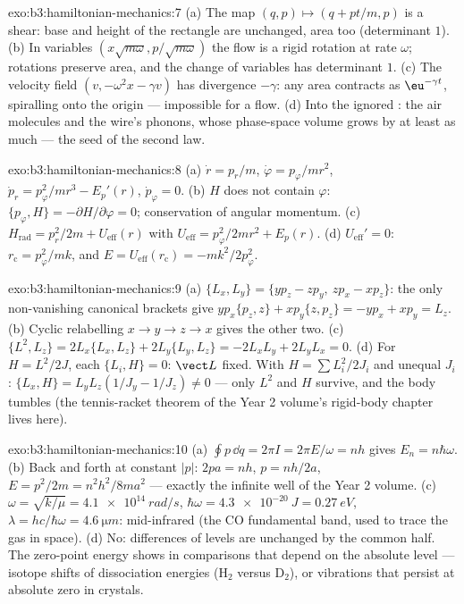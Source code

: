 \begin{solution}{exo:b3:hamiltonian-mechanics:7}
(a) The map $(q, p) \mapsto (q + pt/m, p)$ is a shear: base and
height of the rectangle are unchanged, area too (determinant $1$).
(b) In variables $(x\sqrt{m\omega}, p/\sqrt{m\omega})$ the flow is a
rigid rotation at rate $\omega$; rotations preserve area, and the
change of variables has determinant $1$. (c) The velocity field
$(v, -\omega^2x - \gamma v)$ has divergence $-\gamma$: any area
contracts as $\eu^{-\gamma t}$, spiralling onto the origin ---
impossible for a  flow. (d) Into the ignored : the air molecules and the wire's phonons, whose phase-space
volume grows by at least as much --- the seed of the second law.
\end{solution}

\begin{solution}{exo:b3:hamiltonian-mechanics:8}
(a) $\dot r = p_r/m$, $\dot\varphi = p_\varphi/mr^2$, $\dot p_r =
p_\varphi^2/mr^3 - E_p'(r)$, $\dot p_\varphi = 0$. (b) $H$ does not
contain $\varphi$: $\{p_\varphi, H\} = -\partial H/\partial\varphi =
0$; conservation of angular momentum. (c) $H_{\text{rad}} = p_r^2/2m +
U_{\text{eff}}(r)$ with $U_{\text{eff}} = p_\varphi^2/2mr^2 + E_p(r)$.
(d) $U_{\text{eff}}' = 0$: $r_{\text{c}} = p_\varphi^2/mk$, and $E =
U_{\text{eff}}(r_{\text{c}}) = -mk^2/2p_\varphi^2$.
\end{solution}

\begin{solution}{exo:b3:hamiltonian-mechanics:9}
(a) $\{L_x, L_y\} = \{yp_z - zp_y,\ zp_x - xp_z\}$: the only
non-vanishing canonical brackets give $yp_x\{p_z, z\} + xp_y\{z,
p_z\} = -yp_x + xp_y = L_z$. (b) Cyclic relabelling $x \to y \to z \to
x$ gives the other two. (c) $\{L^2, L_z\} = 2L_x\{L_x, L_z\} +
2L_y\{L_y, L_z\} = -2L_xL_y + 2L_yL_x = 0$. (d) For $H = L^2/2J$,
each $\{L_i, H\} = 0$: $\vect L$ fixed. With $H = \sum L_i^2/2J_i$
and unequal $J_i$: $\{L_x, H\} = L_yL_z(1/J_y - 1/J_z) \neq 0$ ---
only $L^2$ and $H$ survive, and the body tumbles (the tennis-racket
theorem of the Year 2 volume's rigid-body chapter lives here).
\end{solution}

\begin{solution}{exo:b3:hamiltonian-mechanics:10}
(a) $\oint p\,\dd q = 2\pi I = 2\pi E/\omega = nh$ gives $E_n =
n\hbar\omega$. (b) Back and forth at constant $|p|$: $2pa = nh$, $p =
nh/2a$, $E = p^2/2m = n^2h^2/8ma^2$ --- exactly the infinite well of
the Year 2 volume. (c) $\omega = \sqrt{k/\mu} = \qty{4.1e14}{rad/s}$,
$\hbar\omega = \qty{4.3e-20}{J} = \qty{0.27}{eV}$, $\lambda = hc/
\hbar\omega = \qty{4.6}{\micro m}$: mid-infrared (the CO fundamental
band, used to trace the gas in space). (d) No: differences of levels
are unchanged by the common half. The zero-point energy shows in
comparisons that depend on the absolute level --- isotope shifts of
dissociation energies (H$_2$ versus D$_2$), or vibrations that
persist at absolute zero in crystals.
\end{solution}


